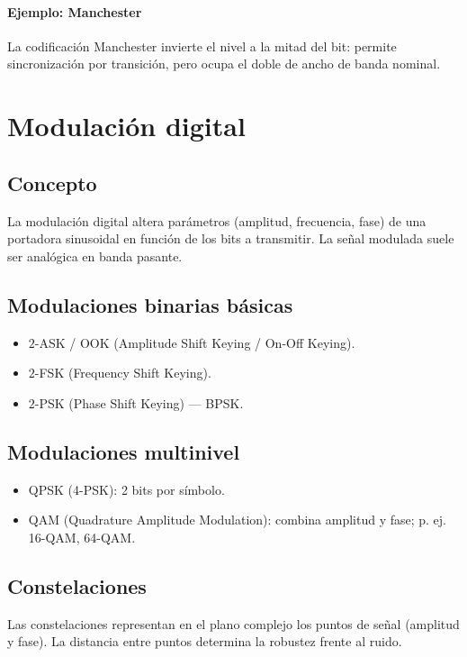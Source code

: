 \documentclass[11pt,a4paper]{article}
\begin{document}
\paragraph{Ejemplo: Manchester}
La codificación Manchester invierte el nivel a la mitad del bit: permite sincronización por transición, pero ocupa el doble de ancho de banda nominal.

\section{Modulación digital}
\subsection{Concepto}
La modulación digital altera parámetros (amplitud, frecuencia, fase) de una portadora sinusoidal en función de los bits a transmitir. La señal modulada suele ser analógica en banda pasante.

\subsection{Modulaciones binarias básicas}
\begin{itemize}
  \item $2$-ASK / OOK (Amplitude Shift Keying / On-Off Keying).
  \item $2$-FSK (Frequency Shift Keying).
  \item $2$-PSK (Phase Shift Keying) — BPSK.
\end{itemize}

\subsection{Modulaciones multinivel}
\begin{itemize}
  \item QPSK (4-PSK): 2 bits por símbolo.
  \item QAM (Quadrature Amplitude Modulation): combina amplitud y fase; p. ej. 16-QAM, 64-QAM.
\end{itemize}

\subsection{Constelaciones}
Las constelaciones representan en el plano complejo los puntos de señal (amplitud y fase). La distancia entre puntos determina la robustez frente al ruido.

\end{document}
